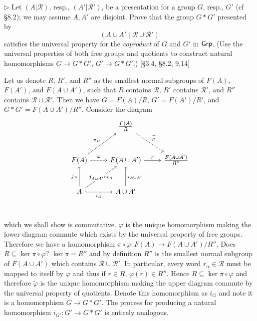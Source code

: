 \begin{problem}
	$\triangleright$ Let $(A|\mathscr{R})$, resp., $(A'|\mathscr{R}')$, be a presentation for a group $G$, resp., $G'$ (cf \S8.2); we may assume $A, A'$ are disjoint. Prove that the group $G * G'$ presented by
	\[
		(A \cup A' \mid \mathscr{R} \cup \mathscr{R}')
	\]
	satisfies the universal property for the \emph{coproduct} of $G$ and $G'$ in $\mathsf{Grp}$. (Use the universal properties of both free groups and quotients to construct natural homomorphisms $G \to G * G'$, $G' \to G * G'$.) [\S3.4, \S8.2, 9.14]
\end{problem}

\begin{solution}
	Let us denote $R$, $R'$, and $R''$ as the smallest normal subgroups of $F(A)$, $F(A')$, and $F(A \cup A')$, such that $R$ contains $\mathscr{R}$, $R'$ contains $\mathscr{R}'$, and $R''$ contains $\mathscr{R} \cup \mathscr{R}'$. Then we have $G = F(A)/R$, $G' = F(A')/R'$, and $G * G' = F(A \cup A')/R''$. Consider the diagram
	\begin{equation*}
		\begin{tikzcd}[row sep=large]
			& \frac{F(A)}{R}
			\arrow[dr, dashrightarrow, "\widetilde{\varphi}"]
			& \\
			F(A)
			\arrow[ur, "\pi_R"]
			\arrow[r, dashrightarrow, "\varphi"]
			& F(A \cup A')
			\arrow[r, "\pi"]
			& \frac{F(A \cup A')}{R''} \\
			A
			\arrow[u, "j_A"]
			\arrow[r, hookrightarrow, "i_A"']
			\arrow[ur, "j_{A \cup A'} \circ i_A" description]
			& A \cup A'
			\arrow[u, "j_{A \cup A'}"']
			& \\
		\end{tikzcd}
	\end{equation*}
	which we shall show is commutative. $\varphi$ is the unique homomorphism making the lower diagram commute which exists by the universal property of free groups. Therefore we have a homomorphism $\pi \circ \varphi: F(A) \to F(A \cup A')/R''$. Does $R \subseteq \ker \pi \circ \varphi$? $\ker \pi = R''$ and by definition $R''$ is the smallest normal subgroup of $F(A \cup A')$ which contains $\mathscr{R} \cup \mathscr{R'}$. In particular, every word $r_\alpha \in \mathscr{R}$ must be mapped to itself by $\varphi$ and thus if $r \in R$, $\varphi(r) \in R''$. Hence $R \subseteq \ker \pi \circ \varphi$ and therefore $\widetilde{\varphi}$ is the unique homomorphism making the upper diagram commute by the universal property of quotients. Denote this homomorphism as $i_G$ and note it is a homomorphism $G \to G * G'$. The process for producing a natural homomorphism $i_{G'}: G' \to G * G'$ is entirely analogous.
	

\end{solution}
